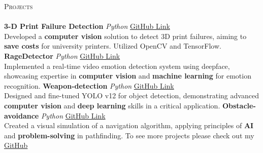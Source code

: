 \documentclass[a4paper]{article}
\newcommand{\lineunder} {
    \vspace*{-8pt} \\
    \hspace*{-18pt} \hrulefill \\
}
\newcommand{\header} [1] {
    {\hspace*{-18pt}\vspace*{6pt} \textsc{#1}}
    \vspace*{-6pt} \lineunder
}
\begin{document}
\header{Projects}
{\textbf{3-D Print Failure Detection}} {\sl Python} \hfill \href{https://github.com/p3rc1va1/3D-Print-Failure-Detection}{GitHub Link}\\
Developed a \textbf{computer vision} solution to detect 3D print failures, aiming to \textbf{save costs} for university printers. Utilized OpenCV and TensorFlow.
\vspace*{2mm}
{\textbf{RageDetector}} {\sl Python} \hfill \href{https://github.com/p3rc1va1/RageDetector}{GitHub Link}\\
Implemented a real-time video emotion detection system using deepface, showcasing expertise in \textbf{computer vision} and \textbf{machine learning} for emotion recognition.
\vspace*{2mm}
{\textbf{Weapon-detection}}   {\sl    Python} \hfill \href{https://github.com/p3rc1va1/weapon-detection}{GitHub Link}\\
Designed and fine-tuned YOLO v12 for object detection, demonstrating advanced \textbf{computer vision} and \textbf{deep learning} skills in a critical application.
\vspace*{2mm}
{\textbf{Obstacle-avoidance}} {\sl Python} \hfill \href{https://github.com/p3rc1va1/Obstacle-avoidance}{GitHub Link}\\
Created a visual simulation of a navigation algorithm, applying principles of \textbf{AI} and \textbf{problem-solving} in pathfinding.
\vspace*{2mm}
To see more projects please check out my \href{https://github.com/p3rc1va1}{GitHub}
\ 
\end{document}
